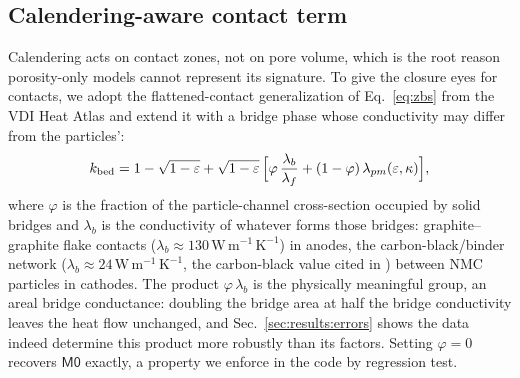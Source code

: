 \documentclass[10pt,a4paper]{article}
\newcommand{\lamf}{\lambda_{f}}
\newcommand{\lamb}{\lambda_{b}}
\newcommand{\WmK}{\,\mathrm{W\,m^{-1}\,K^{-1}}}
\newcommand{\Mzero}{\ensuremath{\mathsf{M0}}}
\begin{document}
\subsection{Calendering-aware contact term}
\label{sec:model:contact}

Calendering acts on contact zones, not on pore volume, which is the root reason porosity-only models cannot represent its signature. To give the closure eyes for contacts, we adopt the flattened-contact generalization of Eq.~\eqref{eq:zbs} from the VDI Heat Atlas \cite{vdi} and extend it with a bridge phase whose conductivity may differ from the particles':
\begin{equation}
k_{\mathrm{bed}}
= 1-\sqrt{1-\varepsilon}+\sqrt{1-\varepsilon}\,
\Bigl[\varphi\,\frac{\lamb}{\lamf} + (1-\varphi)\,\lambda_{pm}(\varepsilon,\kappa)\Bigr],
\label{eq:contact}
\end{equation}
where $\varphi$ is the fraction of the particle-channel cross-section occupied by solid bridges and $\lamb$ is the conductivity of whatever forms those bridges: graphite--graphite flake contacts ($\lamb\approx130\WmK$) in anodes, the carbon-black/binder network ($\lamb\approx24\WmK$, the carbon-black value cited in \cite{gandert2023}) between NMC particles in cathodes. The product $\varphi\,\lamb$ is the physically meaningful group, an areal bridge conductance: doubling the bridge area at half the bridge conductivity leaves the heat flow unchanged, and Sec.~\ref{sec:results:errors} shows the data indeed determine this product more robustly than its factors. Setting $\varphi=0$ recovers \Mzero{} exactly, a property we enforce in the code by regression test.
\end{document}
